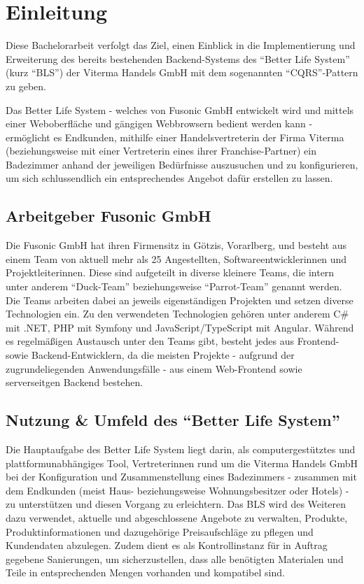 \documentclass[a4paper,12pt,twoside]{scrreprt}
\begin{document}
\chapter{Einleitung}
\label{chap:einleitung}
Diese Bachelorarbeit verfolgt das Ziel, einen Einblick in die Implementierung und Erweiterung des bereits bestehenden Backend-Systems des \enquote{Better Life System} (kurz \enquote{BLS}) der Viterma Handels GmbH mit dem sogenannten \enquote{CQRS}-Pattern zu geben.

Das Better Life System - welches von Fusonic GmbH entwickelt wird und mittels einer Weboberfläche und gängigen Webbrowsern bedient werden kann - ermöglicht es Endkunden, mithilfe einer Handelsvertreterin der Firma Viterma (beziehungsweise mit einer Vertreterin eines ihrer Franchise-Partner) ein Badezimmer anhand der jeweiligen Bedürfnisse auszusuchen und zu konfigurieren, um sich schlussendlich ein entsprechendes Angebot dafür erstellen zu lassen.

\section{Arbeitgeber Fusonic GmbH}
\label{sec:arbeitgeber}
Die Fusonic GmbH hat ihren Firmensitz in Götzis, Vorarlberg, und besteht aus einem Team von aktuell mehr als 25 Angestellten, Softwareentwicklerinnen und Projektleiterinnen. Diese sind aufgeteilt in diverse kleinere Teams, die intern unter anderem \enquote{Duck-Team} beziehungsweise \enquote{Parrot-Team} genannt werden. Die Teams arbeiten dabei an jeweils eigenständigen Projekten und setzen diverse Technologien ein. Zu den verwendeten Technologien gehören unter anderem C\# mit .NET, PHP mit Symfony und JavaScript/TypeScript mit Angular. \parencite[vgl.]["Übersicht aller Technologien"]{fusonic_gmbh_web_nodate} Während es  regelmäßigen Austausch unter den Teams gibt, besteht jedes aus Frontend- sowie Backend-Entwicklern, da die meisten Projekte - aufgrund der zugrundeliegenden Anwendungsfälle - aus einem Web-Frontend sowie serverseitgen Backend bestehen.

\section{Nutzung \& Umfeld des \enquote{Better Life System}}
\label{sec:nutzung-umfeld}
Die Hauptaufgabe des Better Life System liegt darin, als computergestütztes und plattformunabhängiges Tool, Vertreterinnen rund um die Viterma Handels GmbH bei der Konfiguration und Zusammenstellung eines Badezimmers - zusammen mit dem Endkunden (meist Haus- beziehungsweise Wohnungsbesitzer oder Hotels) - zu unterstützen und diesen Vorgang zu erleichtern. Das BLS wird des Weiteren dazu verwendet, aktuelle und abgeschlossene Angebote zu verwalten, Produkte, Produktinformationen und dazugehörige Preisaufschläge zu pflegen und Kundendaten abzulegen. Zudem dient es als Kontrollinstanz für in Auftrag gegebene Sanierungen, um sicherzustellen, dass alle benötigten Materialen und Teile in entsprechenden Mengen vorhanden und kompatibel sind.
\end{document}
